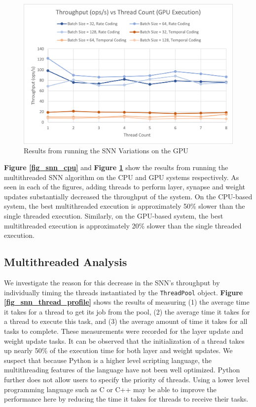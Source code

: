 \documentclass[journal]{IEEEtran}
\begin{document}
\begin{figure}[!t]
\centering
\includegraphics[width=\linewidth]{snn_results2.png}
\caption{Results from running the SNN Variations on the GPU}
\label{fig_snn_gpu}
\end{figure}

\textbf{Figure \ref{fig_snn_cpu}} and \textbf{Figure \ref{fig_snn_gpu}} show the results from running the multithreaded SNN algorithm on the CPU and GPU systems respectively. As seen in each of the figures, adding threads to perform layer, synapse and weight updates substantially decreased the throughput of the system. On the CPU-based system, the best multithreaded execution is approximately 50\% slower than the single threaded execution. Similarly, on the GPU-based system, the best multithreaded execution is approximately 20\% slower than the single threaded execution.


\subsection{Multithreaded Analysis}

We investigate the reason for this decrease in the SNN's throughput by individually timing the threads instantiated by the \verb|ThreadPool| object. \textbf{Figure \ref{fig_snn_thread_profile}} shows the results of measuring (1) the average time it takes for a thread to get its job from the pool, (2) the average time it takes for a thread to execute this task, and (3) the average amount of time it takes for all tasks to complete. These measurements were recorded for the layer update and weight update tasks. It can be observed that the initialization of a thread takes up nearly 50\% of the execution time for both layer and weight updates. We suspect that because Python is a higher level scripting language, the multithreading features of the language have not been well optimized. Python further does not allow users to specify the priority of threads. Using a lower level programming language such as C or C++ may be able to improve the performance here by reducing the time it takes for threads to receive their tasks. 
\end{document}
